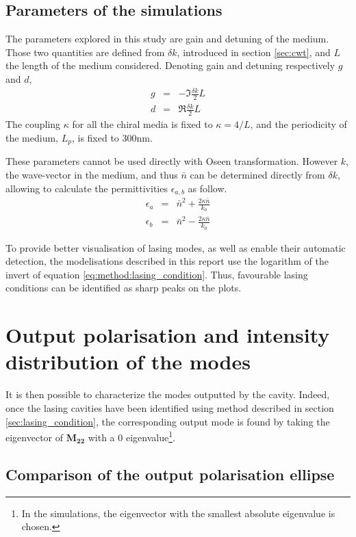 \subsection{Parameters of the simulations}

The parameters explored in this study are gain and detuning of the medium. Those two quantities are defined from $\delta k$, introduced in section \ref{sec:cwt}, and $L$ the length of the medium considered. Denoting gain and detuning respectively $g$ and $d$,
\begin{eqnarray}
	g &=& - \Im{\frac{\delta k}{2}L}\\
	d &=& \Re{\frac{\delta k}{2}L}
\end{eqnarray}
%
The coupling $\kappa$ for all the chiral media is fixed to $\kappa=4/L$, and the periodicity of the medium, $L_p$, is fixed to 300nm.

These parameters cannot be used directly with Oseen transformation. However $k$, the wave-vector in the medium, and thus $\bar{n}$ can be determined directly from $\delta k$, allowing to calculate the permittivities $\epsilon_{a,b}$ as follow.
\begin{eqnarray}
\epsilon_a &=& \bar{n}^2 + \frac{2\kappa\bar{n}}{k_0}\\
\epsilon_b &=& \bar{n}^2 - \frac{2\kappa\bar{n}}{k_0}
\end{eqnarray} 

To provide better visualisation of lasing modes, as well as enable their automatic detection, the modelisations described in this report use the logarithm of the invert of equation \ref{eq:method:lasing_condition}. Thus, favourable lasing conditions can be identified as sharp peaks on the plots.



\section{Output polarisation and intensity distribution of the modes}
\label{sec:output_pol}
It is then possible to characterize the modes outputted by the cavity. Indeed, once the lasing cavities have been identified using method described in section \ref{sec:lasing_condition}, the corresponding output mode is found by taking the eigenvector of $\bm{M_{22}}$ with a 0 eigenvalue\footnote{In the simulations, the eigenvector with the smallest absolute eigenvalue is chosen.}.
\subsection{Comparison of the output polarisation ellipse}

